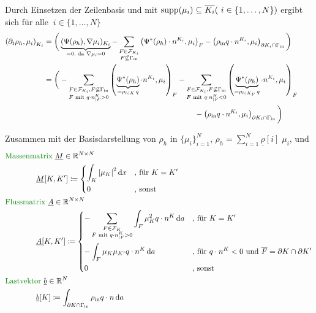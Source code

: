 Durch Einsetzen der Zeilenbasis und mit $ \operatorname{supp}(\mu_i) \subseteq \overline{K_i} (\ i \in \{1, \dots , N\})$ ergibt sich für alle $\ i \in \{1, \dots , N\}$ 
\begin{align*}
	\left(\partial_t \rho_h, \mu_i  \right)_{K_i}  &= \bigg( \underbrace{(\Psi(\rho_h), \nabla\mu_i)_{K_i}}_{=0 \text{, da } \nabla \mu_i = 0} - \sum_{\substack{F \in \mathcal{F}_{K_i} \\ F \not\subseteq \Gamma_{{\text{in}}}}} \left(\Psi^*(\rho_h) \cdot n^{K_i}, \mu_i \right)_{F} - \left(\rho_{\text{in}} q \cdot n^{K_i}, \mu_i \right)_{\partial K_i \cap \Gamma_{{\text{in}}}} \bigg) \\
	&= \bigg( - \sum_{\substack{F \in \mathcal{F}_{K_i}, F \not\subseteq \Gamma_{{\text{in}}}\\ F \text{ mit }q \cdot n^K_{|F} > 0} } \left(\underbrace{\Psi^*(\rho_h)}_{= \rho_{h|K}\, q} \cdot n^{K_i}, \mu_i \right)_{F} - \sum_{\substack{F \in \mathcal{F}_{K_i}, F \not\subseteq \Gamma_{{\text{in}}}\\ F \text{ mit }q \cdot n^K_{|F} < 0} } \left(\underbrace{\Psi^*(\rho_h)}_{= \rho_{h|K_F} \, q} \cdot n^{K_i}, \mu_i \right)_{F}\\
	& \qquad \qquad \qquad \qquad \qquad \qquad  \qquad \qquad\qquad \qquad- \left(\rho_{\text{in}} q \cdot n^{K_i}, \mu_i \right)_{\partial K_i \cap \Gamma_{{\text{in}}}} \bigg)\qquad \qquad
\end{align*} 

Zusammen mit der Basisdarstellung von $ \rho_h $ in $\{\mu_i  \}_{i=1}^N$, $ \rho_h = \sum_{i=1}^{N} \underline{\rho}[i] \; \mu_i$, und 
\begin{align*}
&\text{\defi{Massenmatrix} } \underline{M}\in \R^{N \times N} \\  &\qquad \qquad \underline{M}[K,K'] \coloneqq \begin{dcases}
\int_K \abs{\mu_K}^2 \diff x & \text{, für } K = K' \\
0 &\text{, sonst}
\end{dcases} \\
&\text{\defi{Flussmatrix} } \underline{A}\in \R^{N \times N} \\ &\qquad \qquad \underline{A}[K,K'] \coloneqq \begin{dcases}
- \sum_{\substack{F\in \mathcal{F}_K \\ F \text{ mit } q\cdot n^K_{|F} > 0}} \int_F \mu_K^2 q \cdot n^K \diff a& \text{, für } K = K' \\
- \int_F \mu_K \mu_{K'} q \cdot n^K \diff a &\text{, für } q \cdot n^K< 0 \text{ und } \overline{F} = \partial K \cap \partial K'\\
0 &\text{, sonst}
\end{dcases} \\
&\text{\defi{Lastvektor} } \underline{b}\in \R^{N} \\ &\qquad \qquad\underline{b}[K] \coloneqq \int_{\partial K \cap \Gammain} \rhoin q \cdot n \diff a
\end{align*}


